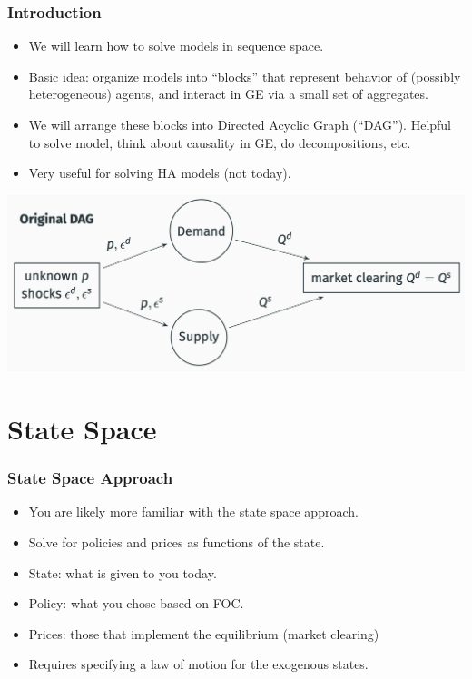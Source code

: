 \documentclass[english,xcolor=svgnames]{beamer}
\begin{document}
\begin{frame}
   \frametitle{Introduction}
   \begin{itemize}
       \item We will learn how to solve models in sequence space.
       \item Basic idea: organize models into ``blocks'' that represent behavior of (possibly heterogeneous) agents, and interact in GE via a small set of aggregates.
       \item We will arrange these blocks into Directed Acyclic Graph (``DAG''). Helpful to solve model, think about causality in GE, do decompositions, etc.
       \item Very useful for solving HA models (not today).
   \end{itemize}
   \centering
   \includegraphics[scale=0.3]{dag/demandsupply.png}
\end{frame}

\section{State Space}

\begin{frame}
   \frametitle{State Space Approach}
   \begin{itemize}
	   \item You are likely more familiar with the state space approach.
       \item Solve for policies and prices as functions of the state.
       \item State: what is given to you today.
       \item Policy: what you chose based on FOC.
       \item Prices: those that implement the equilibrium (market clearing)
       \item Requires specifying a law of motion for the exogenous states.
	\end{itemize}
\end{frame}
\end{document}
